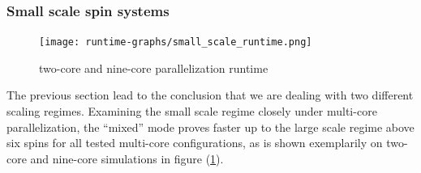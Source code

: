 \documentclass[11.5pt,a4paper]{article}
\begin{document}
\subsubsection{Small scale spin systems}

\begin{figure}
                \centering
                \texttt{[image: runtime-graphs/small\_scale\_runtime.png]}
                \caption{two-core and nine-core parallelization runtime}
                \label{fig-total-sc-runtime}
\end{figure}
The previous section lead to the conclusion that we are dealing with two different scaling regimes. Examining the small scale regime closely under multi-core parallelization, the ``mixed'' mode proves faster up to the large scale regime above six spins for all tested multi-core configurations, as is shown exemplarily on two-core and nine-core simulations in figure (\ref{fig-total-sc-runtime}).
\end{document}
